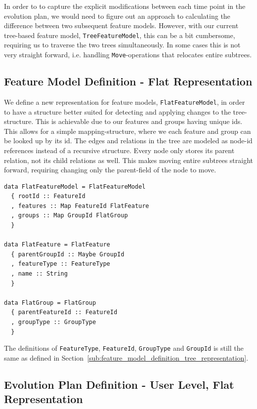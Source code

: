 \documentclass[a4paper,english]{ifimaster}
\begin{document}
In order to to capture the explicit modifications between each time point in the evolution plan, we would need to figure out an approach to calculating the difference between two subsequent feature models. However, with our current tree-based feature model, \texttt{TreeFeatureModel}, this can be a bit cumbersome, requiring us to traverse the two trees simultaneously. In some cases this is not very straight forward, i.e. handling \texttt{Move}-operations that relocates entire subtrees.

\subsection{Feature Model Definition - Flat Representation}%
\label{sub:feature_model_definition_flat_representation}

We define a new representation for feature models, \texttt{FlatFeatureModel}, in order to have a structure better suited for detecting and applying changes to the tree-structure. This is achievable due to our features and groups having unique ids. This allows for a simple mapping-structure, where we each feature and group can be looked up by its id. The edges and relations in the tree are modeled as node-id references instead of a recursive structure. Every node only stores its parent relation, not its child relations as well. This makes moving entire subtrees straight forward, requiring changing only the parent-field of the node to move.

\begin{verbatim}
data FlatFeatureModel = FlatFeatureModel
  { rootId :: FeatureId
  , features :: Map FeatureId FlatFeature
  , groups :: Map GroupId FlatGroup
  }

data FlatFeature = FlatFeature
  { parentGroupId :: Maybe GroupId
  , featureType :: FeatureType
  , name :: String
  }

data FlatGroup = FlatGroup
  { parentFeatureId :: FeatureId
  , groupType :: GroupType
  }
\end{verbatim}

The definitions of \texttt{FeatureType}, \texttt{FeatureId}, \texttt{GroupType} and \texttt{GroupId} is still the same as defined in Section~\vref{sub:feature_model_definition_tree_representation}.

\subsection{Evolution Plan Definition - User Level, Flat Representation}%
\label{sub:evolution_plan_definition_user_level_flat_representation}
\end{document}

